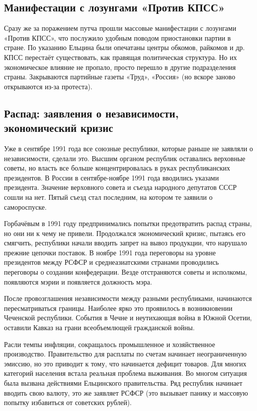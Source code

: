 \subsection{Манифестации с лозунгами «Против КПСС»}
Сразу же за поражением путча прошли массовые манифестации с лозунгами «Против КПСС», что послужило удобным поводом приостановки партии в стране. По указанию Ельцина были опечатаны центры обкомов, райкомов и др. КПСС перестаёт существовать, как правящая политическая структура. Но их экономическое влияние не пропало, просто перешло в другие подразделения страны. Закрываются партийные газеты «Труд», «Россия» (но вскоре заново открываются из-за протеста).

\subsection{Распад: заявления о независимости, экономический кризис}
Уже в сентябре 1991 года все союзные республики, которые раньше не заявляли о независимости, сделали это. Высшим органом республик оставались верховные советы, но власть все больше концентрировалась в руках республиканских президентов. В России в сентябре-ноябре 1991 года вводились указами президента. Значение верховного совета и съезда народного депутатов СССР сошли на нет. Пятый съезд стал последним, на котором те заявили о самороспуске. 

Горбачёвым в 1991 году предпринимались попытки предотвратить распад страны, но они ни к чему не привели. Продолжался экономический кризис, пытаясь его смягчить, республики начали вводить запрет на вывоз продукции, что нарушало прежние цепочки поставок. В ноябре 1991 года переговоры на уровне президентов между РСФСР и среднеазиатскими странами проводились переговоры о создании конфедерации.
Везде отстраняются советы и исполкомы, появляются мэрии и появляется должность мэра.

После провозглашения независимости между разными республиками, начинаются пересматриваться границы. Наиболее ярко это проявилось в возникновении Чеченской республики. События в Чечне и неутихающая война в Южной Осетии, оставили Кавказ на грани всеобъемлющей гражданской войны.

Расли темпы инфляции, сокращалось промышленное и хозяйственное производство. Правительство для расплаты по счетам начинает неограниченную эмиссию, но это приводит к тому, что начинается дефицит товаров. Для многих категорий населения встала реальная проблема выживания. Во многом ситуация была вызвана действиями Ельцинского правительства. Ряд республик начинает вводить свою валюту, это же заявляет РСФСР (это вызывает панику и массовую попытку избавиться от советских рублей).

